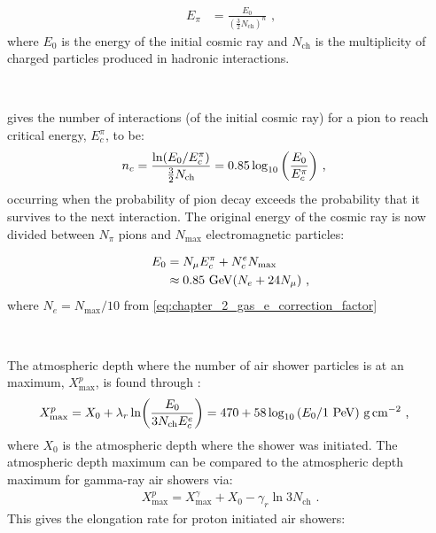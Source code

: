 \begin{equation}
    \begin{aligned}
    E_\pi &=\frac{E_0}{(\frac{3}{2}N_\text{ch})^n}\text{ ,}
    \end{aligned}
\end{equation}
\noindent where $E_0$ is the energy of the initial cosmic ray and $N_\text{ch}$ is the multiplicity of charged particles produced in hadronic interactions.
\par~\par
\cite{MATTHEWS2005387} gives the number of interactions (of the initial cosmic ray) for a pion to reach critical energy, $E_c^\pi$, to be:
\begin{equation}
    \begin{aligned}
    n_c&=\frac{\ln(E_0/E_c^\pi)}{\frac{3}{2}N_\text{ch}}=0.85\log_{10}\qty(\frac{E_0}{E_c^\pi}) \text{ ,}
    \end{aligned}
\end{equation}
\noindent occurring when the probability of pion decay exceeds the probability that it survives to the next interaction. The original energy of the cosmic ray is now divided between $N_\pi$ pions and $N_\text{max}$ electromagnetic particles:

\begin{equation}
    \begin{aligned}
    E_0&=N_\mu E_c^\pi + N_c^e N_\text{max} \\
 &\approx 0.85~\si{\giga\electronvolt}\qty(N_e+24 N_\mu)\text{ ,}
    \end{aligned}
\end{equation}
\noindent where $N_e=N_\text{max}/10$ from \autoref{eq:chapter_2_gas_e_correction_factor}
\par~\par
The atmospheric depth where the number of air shower particles is at an maximum, $X_\text{max}^p$, is found through \citep{MATTHEWS2005387}:
\begin{equation}
    \begin{aligned}
    X_\text{max}^p&= X_0 + \lambda_r\ln(\frac{E_0}{3N_\text{ch}E_c^e}) =470+58\log_{10}\qty(E_0/1~\PeV)~\grampercentimetresquared \text{ ,}  
    \end{aligned}
\end{equation}
\noindent where $X_0$ is the atmospheric depth where the shower was initiated. The atmospheric depth maximum can be compared to the atmospheric depth maximum for gamma-ray air showers via:
\begin{equation}
    \begin{aligned}
    X_\text{max}^p=X_\text{max}^\gamma+X_0-\gamma_r\ln 3N_\text{ch}\text{ .}
    \end{aligned}
\end{equation}
\noindent This gives the elongation rate for proton initiated air showers:

